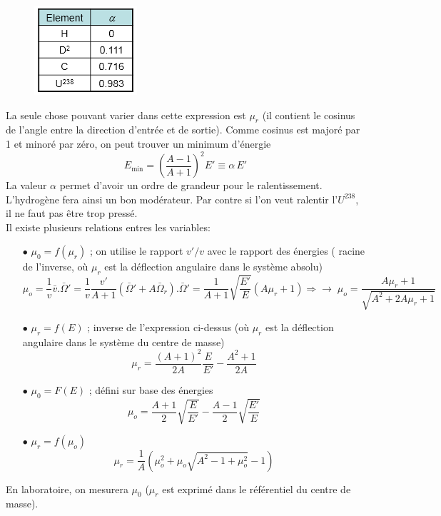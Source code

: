 	\begin{figure}
	\vspace{-5mm}
	\includegraphics[scale=0.7]{ch7/image2.png}
	\end{figure}
	La seule chose pouvant varier dans cette expression est $\mu_r$ (il contient le cosinus de l'angle
	entre la direction d'entrée et de sortie). Comme cosinus est majoré par 1 et minoré par zéro, 
	on peut trouver un minimum d'énergie
	\begin{equation}
	{E_{\min }} = {\left( {\frac{{A - 1}}{{A + 1}}} \right)^2}E' \equiv \alpha \,E'
	\end{equation}
	La valeur $\alpha$ permet d'avoir un ordre de grandeur pour le ralentissement. L'hydrogène 
	fera ainsi un bon modérateur. Par contre si l'on veut ralentir l'$U^{238}$, il ne faut pas 
	être trop pressé.\\
	
	Il existe plusieurs relations entres les variables:
	\begin{itemize}
	\item[$\bullet$] $\mu_0=f(\mu_r)$ ; on utilise le rapport $v'/v$ avec le rapport des énergies (
	racine de l'inverse, où $\mu_r$ est la déflection angulaire dans le système absolu)
	\begin{equation}
	{\mu _o} = \frac{1}{v}\bar v.\bar \Omega ' = \frac{1}{v}\frac{{v'}}{{A + 1}}(\bar \Omega ' +
	 A{\bar \Omega _r}).\bar \Omega '  = \frac{1}{{A + 1}}\sqrt {\frac{{E'}}{E}} (A{\mu _r} + 1)
	 \Rightarrow  \to \;{\mu _o} = \frac{{A{\mu _r} + 1}}{{\sqrt {{A^2} + 2A{\mu _r} + 1} }}
	\end{equation}
	\item[$\bullet$] ${\mu _r} = f(E)$ ; inverse de l'expression ci-dessus (où $\mu_r$ est la 
	déflection angulaire dans le système du centre de masse)
	\begin{equation}
	{\mu _r} = \frac{{{{(A + 1)}^2}}}{{2A}}\frac{E}{{E'}} - \frac{{{A^2} + 1}}{{2A}}
	\end{equation}
	\item[$\bullet$] $\mu_0 = F(E)$ ; défini sur base des énergies
	\begin{equation}
	{\mu _o} = \frac{{A + 1}}{2}\sqrt {\frac{E}{{E'}}}  - \frac{{A - 1}}{2}\sqrt {\frac{{E'}}{E}} 
	\end{equation}
	\item[$\bullet$] ${\mu _r} = f({\mu _o})$
	\begin{equation}
	{\mu _r} = \frac{1}{A}(\mu _o^2 + {\mu _o}\sqrt {{A^2} - 1 + \mu _o^2}  - 1)
	\end{equation}
	\end{itemize}
	En laboratoire, on mesurera $\mu_0$ ($\mu_r$ est exprimé dans le référentiel du centre de 
	masse).
	
